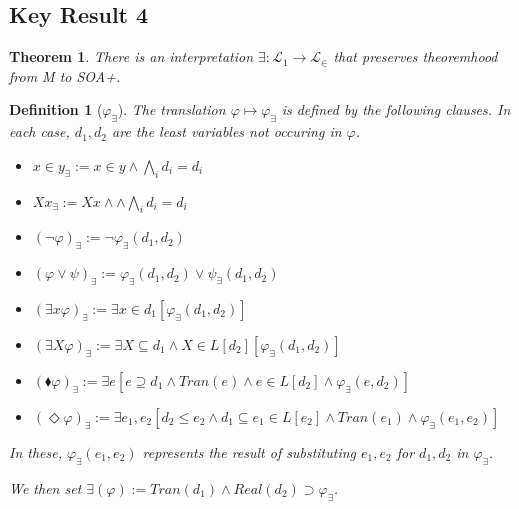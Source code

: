 \documentclass{article}
\newcommand\D{\blacklozenge}
\newtheorem{definition}{Definition}
\newtheorem{theorem}{Theorem}
\begin{document}
\subsection{Key Result 4}
\begin{theorem} 
    There is an interpretation $\exists : \mathcal{L}_1 \to \mathcal{L}_\in$ that preserves 
    theoremhood from M to SOA+.
    \end{theorem}
    \begin{definition}[$\varphi_\exists$]
        The translation $\varphi \mapsto \varphi_\exists$ is defined by the following clauses.
        In each case, $d_1, d_2$ are the least variables not occuring in $\varphi$.
        \begin{itemize}
            \item $x \in y_\exists := x \in y \wedge \bigwedge_i d_i = d_i$
            \item $Xx_\exists := Xx \wedge \wedge \bigwedge_i d_i = d_i$
            \item $(\neg \varphi)_\exists := \neg \varphi_\exists(d_1, d_2)$
            \item $(\varphi \vee \psi)_\exists := \varphi_\exists(d_1, d_2) \vee \psi_\exists(d_1, d_2)$
            \item $(\exists x \varphi)_\exists := \exists x \in d_1[ \varphi_\exists(d_1, d_2)]$
            \item $(\exists X \varphi)_\exists := \exists X \subseteq d_1 \wedge X \in L[d_2] [ \varphi_\exists(d_1, d_2)]$
            \item $(\D \varphi)_\exists := \exists e[e \supseteq d_1 \wedge Tran(e) \wedge e \in L[d_2] \wedge \varphi_\exists(e, d_2)]$
            \item $(\Diamond \varphi)_\exists := \exists e_1, e_2[d_2 \leq e_2 \wedge d_1 \subseteq e_1 \in L[e_2] \wedge Tran(e_1) \wedge \varphi_\exists(e_1, e_2)]$
        \end{itemize}
        In these, $\varphi_\exists(e_1, e_2)$ represents the result of substituting $e_1, e_2$ for $d_1, d_2$ in
        $\varphi_\exists$.
    
        We then set $\exists(\varphi) := Tran(d_1) \wedge Real(d_2) \supset \varphi_\exists$.
    \end{definition}
\end{document}
